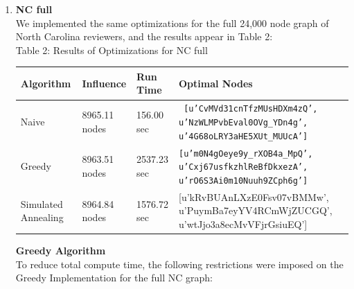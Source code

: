 \documentclass[11pt]{scrartcl} %
\begin{document}
\begin{enumerate}
\item \textbf{NC full}\\
We implemented the same optimizations for the full 24,000 node graph of North Carolina reviewers, and the results appear in Table 2:\\

Table 2: Results of Optimizations for NC full

\begin{center}
\begin{tabular}{ | l | l | l | p{8cm} |}
\hline
Algorithm & Influence & Run Time & Optimal Nodes \\ \hline
Naive & 8965.11 nodes & 156.00 sec & \texttt{ [u'CvMVd31cnTfzMUsHDXm4zQ',
 u'NzWLMPvbEval0OVg\_YDn4g',
 u'4G68oLRY3aHE5XUt\_MUUcA'] }\\ \hline
Greedy & 8963.51 nodes & 2537.23 sec & \texttt{[u'm0N4gOeye9y\_rXOB4a\_MpQ', u'Cxj67usfkzhlReBfDkxezA', u'rO6S3Ai0m10Nuuh9ZCph6g']} \\ \hline
Simulated Annealing & 8964.84 nodes & 1576.72 sec & [u'kRvBUAnLXzE0Fsv07vBMMw', u'PuymBa7eyYV4RCmWjZUCGQ', u'wtJjo3a8ecMvVFjrGsiuEQ'] \\ \hline
\end{tabular}
\end{center}

\textbf{Greedy Algorithm}\\
To reduce total compute time, the following restrictions were imposed on the Greedy Implementation for the full NC graph:\\


\end{enumerate}
\end{document}
